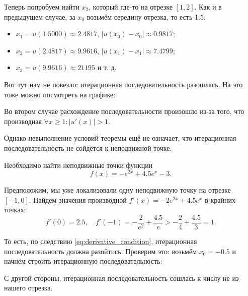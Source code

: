 \documentclass[../main.tex]{subfile}
\begin{document}
\begin{example}
	Теперь попробуем найти $x_2$, который где-то на отрезке $[1,2]$. Как и
	в предыдущем случае, за $x_0$ возьмём середину отрезка, то есть 1.5:
	\begin{itemize}[noitemsep, nolistsep]
		\item $x_1=u(1.5000)\approx 2.4817$, $|u(x_0)-x_0|\approx 0.9817$;
		\item $x_2=u(2.4817)\approx 9.9616$, $|u(x_1)-x_1|\approx 7.4799$;
	\item $x_3=u(9.9616)\approx 21195$ и т. д.
	\end{itemize}

	Вот тут нам не повезло: итерационная последовательность разошлась.
	На это тоже можно посмотреть на графике:
	\newline
	

	Во втором случае расхождение последовательности произошло из-за того,
	что производная $\forall x\ge 1: |u'(x)|>1$.
\end{example}

Однако невыполнение условий теоремы ещё не означает, что итерационная
последовательность не сойдётся к неподвижной точке.

\begin{example}\label{eq:ex_ex}
	Необходимо найти неподвижные точки функции \[f(x)=-e^{2x}+4.5e^x-3.\]

	Предположим, мы уже локализовали одну неподвижную точку на отрезке
	$[-1,0]$. Найдём значения производной $f'(x)=-2e^{2x}+4.5e^x$ в крайних
	точках:
	\[f'(0)=2.5,\quad f'(-1)=-\frac{2}{e^2}+\frac{4.5}{e}>-\frac{2}{4}+
	\frac{4.5}{3}=1.\]

	То есть, по следствию \eqref{eq:derivative_condition}, итерационная
	последовательность должна разойтись. Проверим это: возьмём $x_0=-0.5$
	и начнём строить итерационную последовательность:

	\begin{table}[h]
		\centering
	\end{table}
	
	С другой стороны, итерационная последовательность сошлась к числу не из
	нашего отрезка.
\end{example}
\end{document}
